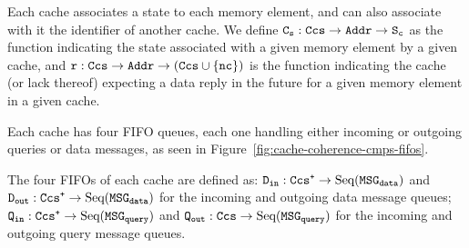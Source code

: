 \begin{definition}
\label{def:cache_info}
Each cache associates a state to each memory element, and can also associate
with it the identifier of another cache. We define $\text{\texttt{C\textsubscript{s}}}{} :
\text{\texttt{Ccs}}{} \to \text{\texttt{Addr}}{} \to \text{\texttt{S\textsubscript{c}}}{}$ as the function indicating
the state associated with a given memory element by a given cache, and
$\text{\texttt{r}}{} : \text{\texttt{Ccs}}{} \to \text{\texttt{Addr}}{} \to (\text{\texttt{Ccs}}{} \cup
\{\text{\texttt{nc}}{}\})$ is the function indicating the cache (or lack thereof)
expecting a data reply in the future for a given memory element in a given
cache.
\end{definition}

Each cache has four FIFO queues, each one handling either incoming or outgoing
queries or data messages, as seen in
Figure~\ref{fig:cache-coherence-cmps-fifos}.

\begin{definition}
\label{def:cache_fifos}
The four FIFOs of each cache are defined as:
$\text{\texttt{D\textsubscript{in}}}{} : \text{\texttt{Ccs\textsuperscript{+}}}{} \to \text{Seq}(\text{\texttt{MSG\textsubscript{data}}}{})$ and
$\text{\texttt{D\textsubscript{out}}}{} : \text{\texttt{Ccs\textsuperscript{+}}}{} \to \text{Seq}(\text{\texttt{MSG\textsubscript{data}}}{})$ for the
incoming and outgoing data message queues;
$\text{\texttt{Q\textsubscript{in}}}{} : \text{\texttt{Ccs\textsuperscript{+}}}{} \to \text{Seq}(\text{\texttt{MSG\textsubscript{query}}}{})$ and
$\text{\texttt{Q\textsubscript{out}}}{} : \text{\texttt{Ccs}}{} \to \text{Seq}(\text{\texttt{MSG\textsubscript{query}}}{})$ for the
incoming and outgoing query message queues.
\end{definition}

